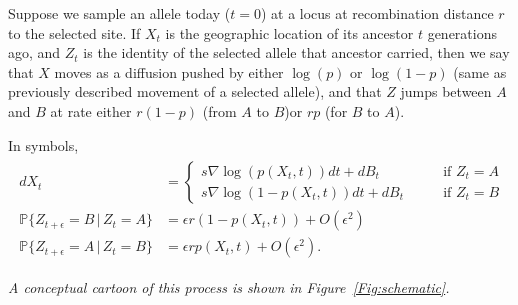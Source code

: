 \documentclass[12pt]{article}
\newcommand{\alisa}[1]{{\em \color{red} #1}}
\renewcommand{\P}{\mathbb{P}}
\newcommand{\grad}{\nabla}
\newcommand{\given}{\,\vert\,}
\begin{document}
Suppose we sample an allele today ($t=0$) at a locus at recombination distance $r$ to the selected site.
If $X_t$ is the geographic location of its ancestor $t$ generations ago,
and $Z_t$ is the identity of the selected allele that ancestor carried,
then we say that $X$ moves as a diffusion pushed by either $\log(p)$ or $\log(1-p)$ (same as previously described movement of a selected allele),
and that $Z$ jumps between $A$ and $B$ at rate either $r (1-p)$  (from $A$ to $B$)or $r p$ (for $B$ to $A$).

In symbols,
\begin{align}
    \begin{aligned} \label{eqn:lineage_motion}
        dX_t &= \begin{cases}
             s \grad \log(p(X_t,t)) dt + dB_t \qquad & \text{if } Z_t = A \\
             s \grad \log(1-p(X_t,t)) dt + dB_t \qquad & \text{if } Z_t = B 
        \end{cases} \\
        \P\{ Z_{t+\epsilon} = B \given Z_t = A \} &= \epsilon r (1-p(X_t,t)) + O(\epsilon^2) \\
        \P\{ Z_{t+\epsilon} = A \given Z_t = B \} &= \epsilon r p(X_t,t) + O(\epsilon^2)  .
    \end{aligned}
\end{align}

\alisa{A conceptual cartoon of this process is shown in Figure~\ref{Fig:schematic}.}
\end{document}
